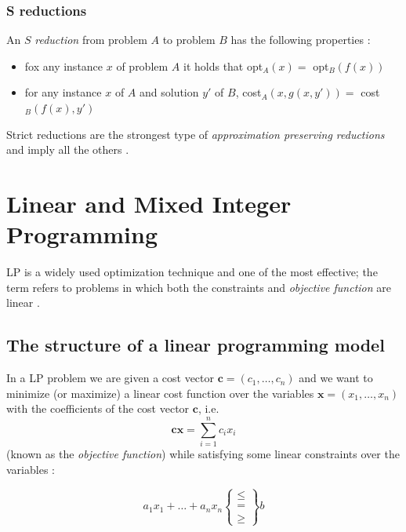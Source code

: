 \subsubsection{S reductions}%
\label{sub:strict_reductions}

An $S$ \emph{reduction} from problem $A$ to problem $B$ has the following properties \cite{Crescenzi1997ASG}:
\begin{itemize}
	\item fox any instance $x$ of problem $A$ it holds that opt$_{A} (x) = $ opt$_{B} (f(x))$
	\item for any instance $x$ of $A$ and solution $y'$ of $B$, cost$_{A} (x,
		      g(x, y')) = $ cost$_{B} (f(x), y')$
\end{itemize}

Strict reductions are the strongest type of \emph{approximation preserving
	reductions} and imply all the others \cite{Crescenzi1997ASG}.

\clearpage

\section{Linear and Mixed Integer Programming}%
\label{sec:linear_and_mixed_integer_programming}

\acrlong{LP} is a widely used optimization technique and one of the most
effective; the term refers to problems in which both the constraints and \emph{objective
	function} are linear
\cite{Edgar2001}\cite{Vanderbei2008}\cite{Dantzig1998}\cite{Martin1998}.

\subsection{The structure of a linear programming model}%
\label{sub:the_structure_of_a_linear_programming_model}

In a \acrfull{LP} problem we are given a cost vector $ \mathbf{c} = (c_1,
	\dots, c_n) $ and we want to minimize (or maximize) a linear cost function over
the variables $ \mathbf{x} = (x_1, \dots, x_n) $ with the coefficients of the
cost vector $ \mathbf{c} $, i.e.
\begin{equation*}
	\mathbf{cx} = \sum^{n}_{i=1} c_i x_i
\end{equation*}
(known as the \emph{objective function}) while satisfying some linear
constraints over the variables \cite{Bertsimas1997}\cite{Vanderbei2008}:

\begin{equation*}
	a_1 x_1 + \dots + a_n x_n \begin{Bmatrix} \leq \\ = \\ \geq \end{Bmatrix} b
\end{equation*}


